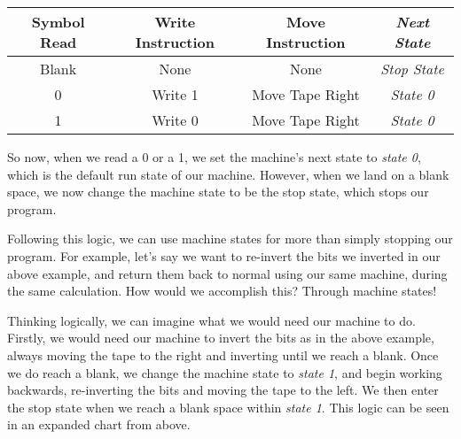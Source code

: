 \documentclass{article}
\begin{document}
    \begin{center}
    \begin{tabular}{||c c c c|} 
    \hline
    Symbol Read & Write Instruction & Move Instruction & \textit {Next State}\\ [0.5ex] 
    \hline\hline
    Blank & None & None & \textit{Stop State}\\ 
     \hline
     0 & Write 1 & Move Tape Right & \textit{State 0}\\
     \hline
     1 & Write 0 & Move Tape Right & \textit{State 0}\\
    \hline
    \end{tabular}
    \end{center}
    
    \medskip\noindent So now, when we read a 0 or a 1, we set the machine's next state to \textit{state 0}, which is the default run state of our machine. However, when we land on a blank space, we now change the machine state to be the stop state, which stops our program. 
    
    \medskip\noindent Following this logic, we can use machine states for more than simply stopping our program. For example, let's say we want to re-invert the bits we inverted in our above example, and return them back to normal using our same machine, during the same calculation. How would we accomplish this? Through machine states! 
    
    \medskip\noindent Thinking logically, we can imagine what we would need our machine to do. Firstly, we would need our machine to invert the bits as in the above example, always moving the tape to the right and inverting until we reach a blank. Once we do reach a blank, we change the machine state to \textit{state 1}, and begin working backwards, re-inverting the bits and moving the tape to the left. We then enter the stop state when we reach a blank space within \textit{state 1}. This logic can be seen in an expanded chart from above.
    
\end{document}
